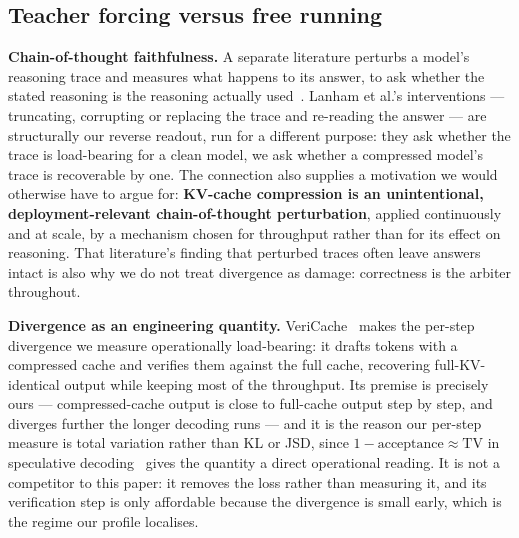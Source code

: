 \documentclass{article}
\newcommand{\TV}{\mathrm{TV}}
\begin{document}
\subsection{Teacher forcing versus free running}
\textbf{Chain-of-thought faithfulness.} A separate literature perturbs a model's reasoning trace and measures what happens to its answer, to ask whether the stated reasoning is the reasoning actually used~\citep{turpin2023cot,lanham2023measuring}. Lanham et al.'s interventions --- truncating, corrupting or replacing the trace and re-reading the answer --- are structurally our reverse readout, run for a different purpose: they ask whether the trace is load-bearing for a clean model, we ask whether a compressed model's trace is recoverable by one. The connection also supplies a motivation we would otherwise have to argue for: \textbf{KV-cache compression is an unintentional, deployment-relevant chain-of-thought perturbation}, applied continuously and at scale, by a mechanism chosen for throughput rather than for its effect on reasoning. That literature's finding that perturbed traces often leave answers intact is also why we do not treat divergence as damage: correctness is the arbiter throughout.

\textbf{Divergence as an engineering quantity.} VeriCache~\citep{vericache2026} makes the per-step divergence we measure operationally load-bearing: it drafts tokens with a compressed cache and verifies them against the full cache, recovering full-KV-identical output while keeping most of the throughput. Its premise is precisely ours --- compressed-cache output is close to full-cache output step by step, and diverges further the longer decoding runs --- and it is the reason our per-step measure is total variation rather than KL or JSD, since $1 - \text{acceptance} \approx \TV$ in speculative decoding~\citep{leviathan2023speculative} gives the quantity a direct operational reading. It is not a competitor to this paper: it removes the loss rather than measuring it, and its verification step is only affordable because the divergence is small early, which is the regime our profile localises.
\end{document}
